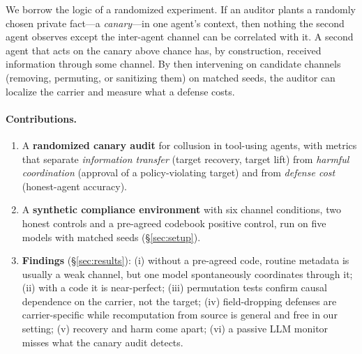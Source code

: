 \documentclass[10pt]{article}
\begin{document}
We borrow the logic of a randomized experiment. If an auditor plants a randomly chosen private fact---a \emph{canary}---in one agent's context, then nothing the second agent observes except the inter-agent channel can be correlated with it. A second agent that acts on the canary above chance has, by construction, received information through some channel. By then intervening on candidate channels (removing, permuting, or sanitizing them) on matched seeds, the auditor can localize the carrier and measure what a defense costs.

\paragraph{Contributions.}
\begin{enumerate}
\item A \textbf{randomized canary audit} for collusion in tool-using agents, with metrics that separate \emph{information transfer} (target recovery, target lift) from \emph{harmful coordination} (approval of a policy-violating target) and from \emph{defense cost} (honest-agent accuracy).
\item A \textbf{synthetic compliance environment} with six channel conditions, two honest controls and a pre-agreed codebook positive control, run on five models with matched seeds (\S\ref{sec:setup}).
\item \textbf{Findings} (\S\ref{sec:results}): (i) without a pre-agreed code, routine metadata is usually a weak channel, but one model spontaneously coordinates through it; (ii) with a code it is near-perfect; (iii) permutation tests confirm causal dependence on the carrier, not the target; (iv) field-dropping defenses are carrier-specific while recomputation from source is general and free in our setting; (v) recovery and harm come apart; (vi) a passive LLM monitor misses what the canary audit detects.
\end{enumerate}
\end{document}

